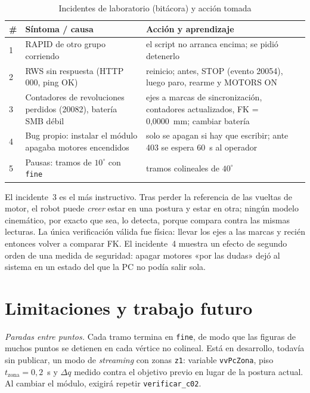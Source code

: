 \documentclass[conference]{IEEEtran}
\begin{document}
\begin{table}[htbp]
\caption{Incidentes de laboratorio (bitácora) y acción tomada}
\label{tab:inc}
\centering
\footnotesize
\setlength{\tabcolsep}{3pt}
\begin{tabular}{@{}>{\raggedright}p{}>{\raggedright}p{}>{\raggedright\arraybackslash}p{}@{}}
\toprule
\# & \textbf{Síntoma / causa} & \textbf{Acción y aprendizaje} \\
\midrule
1 & RAPID de otro grupo corriendo & el script no arranca encima; se pidió detenerlo \\
2 & RWS sin respuesta (HTTP 000, ping OK) & reinicio; antes, STOP (evento 20054), luego paro, rearme y MOTORS ON \\
3 & Contadores de revoluciones perdidos (20082), batería SMB débil & ejes a marcas de sincronización, contadores actualizados, FK = 0{,}0000~mm; cambiar batería \\
4 & Bug propio: instalar el módulo apagaba motores encendidos & solo se apagan si hay que escribir; ante 403 se espera 60~s al operador \\
5 & Pausas: tramos de $10^\circ$ con \texttt{fine} & tramos colineales de $40^\circ$ \\
\bottomrule
\end{tabular}
\end{table}

El incidente~3 es el más instructivo. Tras perder la referencia de las
vueltas de motor, el robot puede \emph{creer} estar en una postura y
estar en otra; ningún modelo cinemático, por exacto que sea, lo detecta,
porque compara contra las mismas lecturas. La única verificación válida
fue física: llevar los ejes a las marcas y recién entonces volver a
comparar FK. El incidente~4 muestra un efecto de segundo orden de una
medida de seguridad: apagar motores «por las dudas» dejó al sistema en
un estado del que la PC no podía salir sola.

\section{Limitaciones y trabajo futuro}

\emph{Paradas entre puntos.} Cada tramo termina en \texttt{fine}, de
modo que las figuras de muchos puntos se detienen en cada vértice no
colineal. Está en desarrollo, todavía sin publicar, un modo de
\emph{streaming} con zonas \texttt{z1}: variable \texttt{vvPcZona}, piso
$t_{\text{zona}}=0{,}2$~s y $\Delta q$ medido contra el objetivo previo
en lugar de la postura actual. Al cambiar el módulo, exigirá repetir
\texttt{verificar\_c02}.
\end{document}
